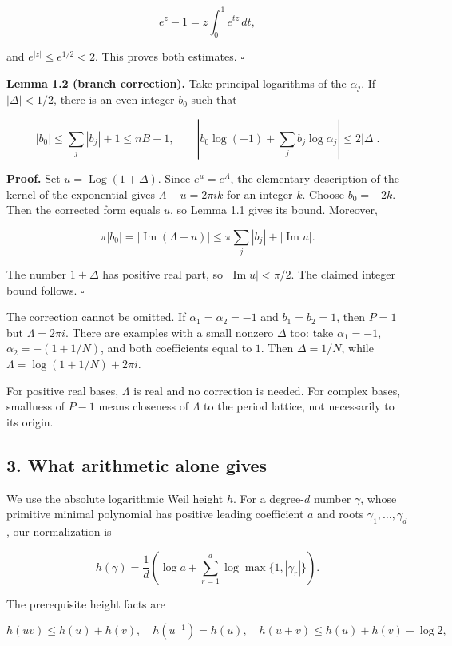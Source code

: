\documentclass[
  11pt,
  a4paper,
]{article}
\begin{document}
\[
e^z-1=z\int_0^1 e^{tz}\,dt,
\]

and \(e^{|z|}\le e^{1/2}<2\). This proves both estimates. \(\square\)

\textbf{Lemma 1.2 (branch correction).} Take principal logarithms of the
\(\alpha_j\). If \(|\Delta|<1/2\), there is an even integer \(b_0\) such
that

\[
|b_0|\le\sum_j|b_j|+1\le nB+1,
\qquad
\left|b_0\log(-1)+\sum_jb_j\log\alpha_j\right|\le2|\Delta|.
\]

\textbf{Proof.} Set \(u=\operatorname{Log}(1+\Delta)\). Since
\(e^u=e^\Lambda\), the elementary description of the kernel of the
exponential gives \(\Lambda-u=2\pi i k\) for an integer \(k\). Choose
\(b_0=-2k\). Then the corrected form equals \(u\), so Lemma 1.1 gives
its bound. Moreover,

\[
\pi|b_0|=|\operatorname{Im}(\Lambda-u)|
\le\pi\sum_j|b_j|+|\operatorname{Im}u|.
\]

The number \(1+\Delta\) has positive real part, so
\(|\operatorname{Im}u|<\pi/2\). The claimed integer bound follows.
\(\square\)

The correction cannot be omitted. If \(\alpha_1=\alpha_2=-1\) and
\(b_1=b_2=1\), then \(P=1\) but \(\Lambda=2\pi i\). There are examples
with a small nonzero \(\Delta\) too: take \(\alpha_1=-1\),
\(\alpha_2=-(1+1/N)\), and both coefficients equal to \(1\). Then
\(\Delta=1/N\), while \(\Lambda=\log(1+1/N)+2\pi i\).

For positive real bases, \(\Lambda\) is real and no correction is
needed. For complex bases, smallness of \(P-1\) means closeness of
\(\Lambda\) to the period lattice, not necessarily to its origin.

\subsection{3. What arithmetic alone
gives}\label{what-arithmetic-alone-gives}

We use the absolute logarithmic Weil height \(h\). For a degree-\(d\)
number \(\gamma\), whose primitive minimal polynomial has positive
leading coefficient \(a\) and roots \(\gamma_1,\ldots,\gamma_d\), our
normalization is

\[
h(\gamma)=\frac1d\left(\log a+\sum_{r=1}^d\log\max\{1,|\gamma_r|\}\right).
\]

The prerequisite height facts are

\[
h(uv)\le h(u)+h(v),\quad h(u^{-1})=h(u),\quad
h(u+v)\le h(u)+h(v)+\log2,
\]
\end{document}
